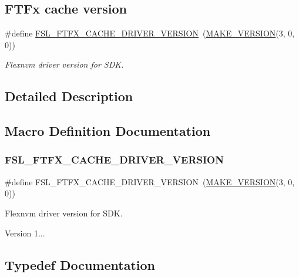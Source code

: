 \subsection*{F\+T\+Fx cache version}
\begin{DoxyCompactItemize}
\item 
\#define \mbox{\hyperlink{group__ftfx__cache__driver_ga03d2543029c1ddce74f55c6ebf83cf93}{F\+S\+L\+\_\+\+F\+T\+F\+X\+\_\+\+C\+A\+C\+H\+E\+\_\+\+D\+R\+I\+V\+E\+R\+\_\+\+V\+E\+R\+S\+I\+ON}}~(\mbox{\hyperlink{group__ftfx__utilities_ga812138aa3315b0c6953c1a26130bcc37}{M\+A\+K\+E\+\_\+\+V\+E\+R\+S\+I\+ON}}(3, 0, 0))
\begin{DoxyCompactList}\small\item\em Flexnvm driver version for S\+DK. \end{DoxyCompactList}\end{DoxyCompactItemize}


\subsection{Detailed Description}


\subsection{Macro Definition Documentation}
\mbox{\label{group__ftfx__cache__driver_ga03d2543029c1ddce74f55c6ebf83cf93}} 
\subsubsection{\texorpdfstring{FSL\_FTFX\_CACHE\_DRIVER\_VERSION}{FSL\_FTFX\_CACHE\_DRIVER\_VERSION}}
{\footnotesize\ttfamily \#define F\+S\+L\+\_\+\+F\+T\+F\+X\+\_\+\+C\+A\+C\+H\+E\+\_\+\+D\+R\+I\+V\+E\+R\+\_\+\+V\+E\+R\+S\+I\+ON~(\mbox{\hyperlink{group__ftfx__utilities_ga812138aa3315b0c6953c1a26130bcc37}{M\+A\+K\+E\+\_\+\+V\+E\+R\+S\+I\+ON}}(3, 0, 0))}



Flexnvm driver version for S\+DK. 

Version 1... 

\subsection{Typedef Documentation}
\mbox{\label{group__ftfx__cache__driver_ga8ddae8f98cec13ff7c33bc515d01c487}} 
